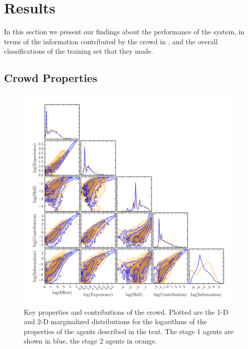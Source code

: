 \documentclass[useAMS,usenatbib,a4paper]{mn2e}
\begin{document}

\section{Results}
\label{sec:results}

In this section we present our findings about the performance of the  \sw
system, in terms of the information  contributed by the crowd in
, and the overall classifications of the training set
that they made. 


\subsection{Crowd Properties}
\label{sec:results:crowd}


\begin{figure}
\centering\includegraphics[width=0.9\linewidth]{sw-system-figs/all_skill_contribution_experience_education.png}
\caption{Key properties and contributions of the \sw crowd. Plotted are the
1-D and 2-D marginalized distributions for the logarithms of the 
properties of the agents described in the text. The stage 1 agents are shown
in blue, the stage 2 agents in orange.}
\label{fig:crowd:cornerplot}
\end{figure}
\end{document}
